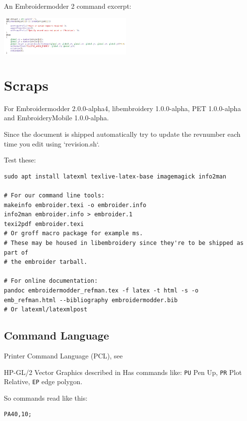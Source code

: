 \documentclass[10pt]{report}
\begin{document}
An Embroidermodder 2 command excerpt:

\includegraphics[width=0.5\textwidth]{images/features-scripting-1.png}


\section{Scraps}

For
Embroidermodder 2.0.0-alpha4, libembroidery 1.0.0-alpha, PET 1.0.0-alpha
and EmbroideryMobile 1.0.0-alpha.

Since the document is shipped automatically try to update the revnumber each
time you edit using `revision.sh`.

Test these:

\begin{lstlisting}
sudo apt install latexml texlive-latex-base imagemagick info2man

# For our command line tools:
makeinfo embroider.texi -o embroider.info
info2man embroider.info > embroider.1
texi2pdf embroider.texi
# Or groff macro package for example ms.
# These may be housed in libembroidery since they're to be shipped as part of
# the embroider tarball.

# For online documentation:
pandoc embroidermodder_refman.tex -f latex -t html -s -o emb_refman.html --bibliography embroidermodder.bib
# Or latexml/latexmlpost
\end{lstlisting}

\subsection{Command Language}

Printer Command Language (PCL), see %

HP-GL/2 Vector Graphics  described in %
Has commands like: \texttt{PU} Pen Up, \texttt{PR} Plot Relative,
\texttt{EP} edge polygon.

So commands read like this:

\begin{lstlisting}
PA40,10;
\end{lstlisting}
\end{document}
